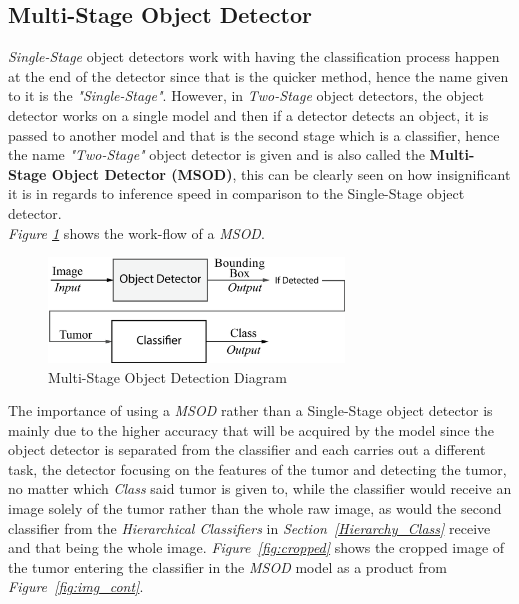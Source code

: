 \documentclass[12pt]{extarticle}
\begin{document}
	\subsection{Multi-Stage Object Detector}\label{Meth}
	\emph{Single-Stage} object detectors work with having the classification process happen at the end of the detector since that is the quicker method, hence the name given to it is the \emph{"Single-Stage"}. However, in \emph{Two-Stage} object detectors, the object detector works on a single model and then if a detector detects an object, it is passed to another model and that is the second stage which is a classifier, hence the name \emph{"Two-Stage"} object detector is given and is also called the \textbf{Multi-Stage Object Detector (MSOD)}, this can be clearly seen on how insignificant it is in regards to inference speed in comparison to the Single-Stage object detector.\\[5mm]
	\emph{Figure \ref{fig:Multi-Stage Obj Detector}} shows the work-flow of a \emph{MSOD}.\\[5mm]
	\begin{figure}[h]
		\centering
		\includegraphics[width=0.7\textwidth]{pics/Figures/Hierarchical_Obj_Det_Block_Diagram.eps}
		\caption{\small{Multi-Stage Object Detection Diagram}}
		\label{fig:Multi-Stage Obj Detector}
	\end{figure}
	The importance of using a \emph{MSOD} rather than a Single-Stage object detector is mainly due to the higher accuracy that will be acquired by the model since the object detector is separated from the classifier and each carries out a different task, the detector focusing on the features of the tumor and detecting the tumor, no matter which \emph{Class} said tumor is given to, while the classifier would receive an image solely of the tumor rather than the whole raw image, as would the second classifier from the \emph{Hierarchical Classifiers} in \emph{Section~\ref{Hierarchy_Class}} receive and that being the whole image. \emph{Figure~\ref{fig:cropped}} shows the cropped image of the tumor entering the classifier in the \emph{MSOD} model as a product from \emph{Figure~\ref{fig:img_cont}}.
\end{document}
